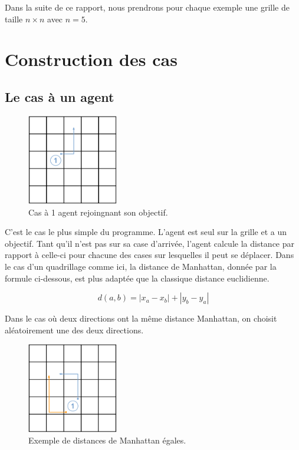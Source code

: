 \documentclass[a4paper, 12pt,twocolumn, french]{article}
\begin{document}
Dans la suite de ce rapport, nous prendrons pour chaque exemple une grille de taille $n \times n$ avec $n = 5$.

\section{Construction des cas}

\subsection{Le cas à un agent}

\begin{figure}[h]
	\centering
	\includegraphics[width=150px]{images/base_case.png}
	\caption{Cas à 1 agent rejoingnant son objectif.}
\end{figure}

C’est le cas le plus simple du programme. L'agent est seul sur la grille et a un objectif. Tant qu'il n'est pas sur sa case d'arrivée, l'agent calcule la distance par rapport à celle-ci pour chacune des cases sur lesquelles il peut se déplacer. Dans le cas d'un quadrillage comme ici, la distance de Manhattan, donnée par la formule ci-dessous, est plus adaptée que la classique distance euclidienne.

\[
d(a, b) = |x_a - x_b| + |y_b - y_a|
\]


Dans le cas où deux directions ont la même distance Manhattan, on choisit aléatoirement une des deux directions.

\begin{figure}[h]
	\centering
	\includegraphics[width=150px]{images/manhattan_equal.png}
	\caption{Exemple de distances de Manhattan égales.}
\end{figure}
\end{document}
